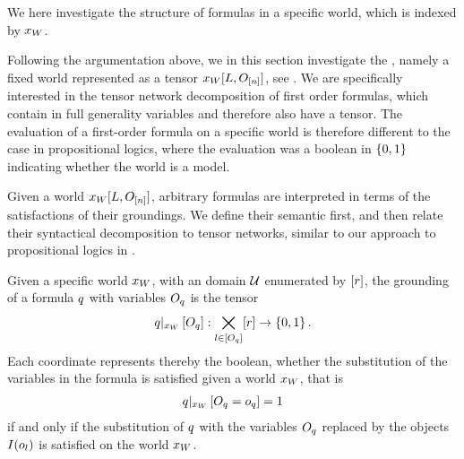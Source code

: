 
\sect{\SubstitutionStructure{}}


We here investigate the structure of formulas in a specific \firstOrderLogic{} world, which is indexed by $x_{W}$.

Following the argumentation above, we in this section investigate the \substitutionStructure{}, namely a fixed world represented as a tensor $x_{W}[L,O_{[n]}]$, see .
We are specifically interested in the tensor network decomposition of first order formulas, which contain in full generality variables and therefore also have a tensor.
The evaluation of a first-order formula on a specific world is therefore different to the case in propositional logics, where the evaluation was a boolean in $\{0,1\}$ indicating whether the world is a model.


Given a \firstOrderLogic{} world $x_{W}[L,O_{[n]}]$, arbitrary formulas are interpreted in terms of the satisfactions of their groundings.
We define their semantic first, and then relate their syntactical decomposition to tensor networks, similar to our approach to propositional logics in .

\begin{definition}
    Given a specific world $x_{W}$, with an domain $\mathcal{U}$ enumerated by $[r]$, the grounding of a formula $q$ with variables $O_{q}$  is the tensor
    \begin{align*}
        {q}|_{x_{W}} \left[O_{q}\right] :
        \bigtimes_{l\in[O_{q}]} [r] \rightarrow \{0,1\} \, .
    \end{align*}
    Each coordinate represents thereby the boolean, whether the substitution of the variables in the formula is satisfied given a world $x_{W}$, that is
    \begin{align*}
        {q}|_{x_{W}} \left[O_{q}=o_{q}\right] = 1
    \end{align*}
    if and only if the substitution of $q$ with the variables $O_{q}$ replaced by the objects $I(o_{l})$ is satisfied on the world $x_{W}$.
\end{definition}

